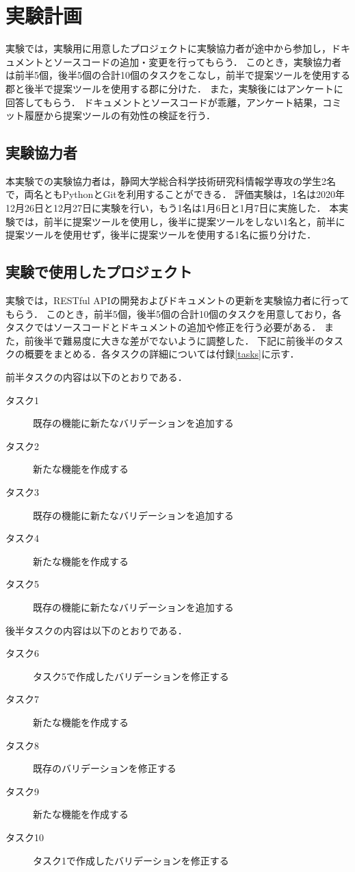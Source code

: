\section{実験計画}
\label{plan}
実験では，実験用に用意したプロジェクトに実験協力者が途中から参加し，ドキュメントとソースコードの追加・変更を行ってもらう．
このとき，実験協力者は前半5個，後半5個の合計10個のタスクをこなし，前半で提案ツールを使用する郡と後半で提案ツールを使用する郡に分けた．
また，実験後にはアンケートに回答してもらう．
ドキュメントとソースコードが乖離，アンケート結果，コミット履歴から提案ツールの有効性の検証を行う．

\subsection{実験協力者}
本実験での実験協力者は，静岡大学総合科学技術研究科情報学専攻の学生2名で，両名ともPythonとGitを利用することができる．
評価実験は，1名は2020年12月26日と12月27日に実験を行い，もう1名は1月6日と1月7日に実施した．
本実験では，前半に提案ツールを使用し，後半に提案ツールをしない1名と，前半に提案ツールを使用せず，後半に提案ツールを使用する1名に振り分けた．

\subsection{実験で使用したプロジェクト}
実験では，RESTful APIの開発およびドキュメントの更新を実験協力者に行ってもらう．
このとき，前半5個，後半5個の合計10個のタスクを用意しており，各タスクではソースコードとドキュメントの追加や修正を行う必要がある．
また，前後半で難易度に大きな差がでないように調整した．
下記に前後半のタスクの概要をまとめる．各タスクの詳細については付録\ref{tasks}に示す．

前半タスクの内容は以下のとおりである．
\begin{description}
    \item[タスク1] 既存の機能に新たなバリデーションを追加する
    \item[タスク2] 新たな機能を作成する
    \item[タスク3] 既存の機能に新たなバリデーションを追加する
    \item[タスク4] 新たな機能を作成する
    \item[タスク5] 既存の機能に新たなバリデーションを追加する
\end{description}

後半タスクの内容は以下のとおりである．
\begin{description}
    \item[タスク6] タスク5で作成したバリデーションを修正する
    \item[タスク7] 新たな機能を作成する
    \item[タスク8] 既存のバリデーションを修正する
    \item[タスク9] 新たな機能を作成する
    \item[タスク10] タスク1で作成したバリデーションを修正する
\end{description}

